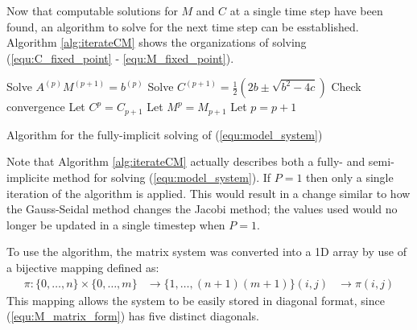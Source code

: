 Now that computable solutions for $M$ and $C$ at a single time step have been found, an algorithm to solve for the next time step can be esstablished.
Algorithm \ref{alg:iterateCM} shows the organizations of solving (\ref{equ:C_fixed_point} - \ref{equ:M_fixed_point}). 
\begin{algorithm}
  \Begin
  {
    {
        Solve $A^{(p)} M^{(p+1)} = b^{(p)}$\;
        Solve $C^{(p+1)} = \frac{1}{2} \left( 2b \pm \sqrt{b^2 - 4c} \right)$\;
        Check convergence\; 
        Let $C^{p} = C_{p+1}$\;
        Let $M^{p} = M_{p+1}$\;
        Let $p = p + 1 $\;
    }
  }
  \caption{Algorithm for the fully-implicit solving of (\ref{equ:model_system}) }
  \label{alg:iterateCM}
\end{algorithm}
Note that Algorithm \ref{alg:iterateCM} actually describes both a fully- and semi- implicite method for solving (\ref{equ:model_system}). 
If $P = 1$ then only a single iteration of the algorithm is applied.
This would result in a change similar to how the Gauss-Seidal method changes the Jacobi method; the values used would no longer be updated in a single timestep when $P = 1$.

To use the algorithm, the matrix system was converted into a 1D array by use of a bijective mapping defined as:
\begin{equation}
\begin{aligned}
  \pi : \{ 0, \ldots, n\} \times \{0, \ldots, m\} &\to \{1, \ldots, (n+1)(m+1) \}
  (i,j) & \to \pi(i,j)
\end{aligned}
\end{equation}
This mapping allows the system to be easily stored in diagonal format, since (\ref{equ:M_matrix_form}) has five distinct diagonals.


